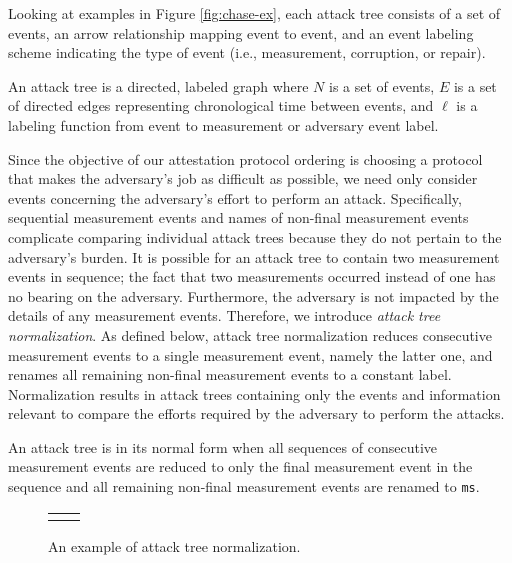 \documentclass[runningheads]{llncs}
\theoremstyle{definition}
\begin{document}
\noindent Looking at examples in Figure \ref{fig:chase-ex}, each
attack tree consists of a set of events, an arrow relationship mapping
event to event, and an event labeling scheme indicating the type of
event (i.e., measurement, corruption, or repair).

\begin{definition}
    An attack tree is a directed, labeled graph where $N$ is a set of
    events, $E$ is a set of directed edges representing chronological
    time between events, and $\ell$ is a labeling function from event
    to measurement or adversary event label. 
\end{definition}

Since the objective of our attestation protocol ordering is choosing 
a protocol that makes the adversary’s job as difficult as possible,
we need only consider events concerning the adversary's effort to 
perform an attack. Specifically, sequential measurement events and names 
of non-final measurement events complicate comparing individual attack 
trees because they do not pertain to the adversary's burden. It is 
possible for an attack tree to contain two measurement events in 
sequence; the fact that two measurements occurred instead of one 
has no bearing on the adversary. Furthermore, the adversary is not 
impacted by the details of any measurement events.  Therefore, we 
introduce \emph{attack tree normalization}. As defined below, attack 
tree normalization reduces consecutive measurement events to a 
single measurement event, namely the latter one, and renames all 
remaining non-final measurement events to a constant label.
Normalization results in attack trees containing only the events and 
information relevant to compare the efforts required by the 
adversary to perform the attacks.

\begin{definition}
    An attack tree is in its normal form when all sequences of
    consecutive measurement events are reduced to only the final
    measurement event in the sequence and all remaining non-final
    measurement events are renamed to \texttt{ms}.  
\end{definition}

\begin{figure}[htbp]
  \centering 
  \begin{tabular}{c c}
       &  
  \end{tabular}
  \captionsetup{justification=centering,margin=1cm}
  \caption[Example of attack tree normalization]{An example of attack tree normalization.}
  \label{fig:reduce-ex}
\end{figure}
\end{document}
